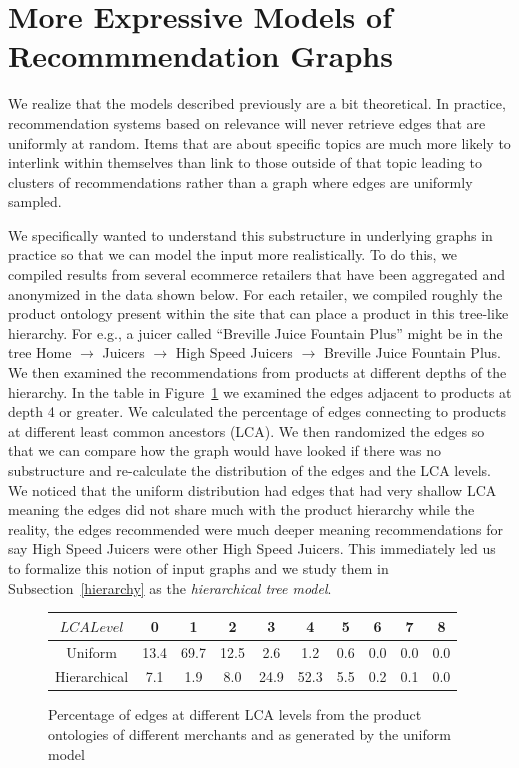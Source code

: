 \section{More Expressive Models of Recommmendation Graphs}

We realize that the models described previously are a bit
theoretical. In practice, recommendation systems based on relevance
will never retrieve edges that are uniformly at random. Items that are
about specific topics are much more likely to interlink within
themselves than link to those outside of that topic leading to
clusters of recommendations rather than a graph where edges are
uniformly sampled.

We specifically wanted to understand this substructure in underlying
graphs in practice so that we can model the input more realistically.
To do this, we compiled results from several ecommerce retailers that
have been aggregated and anonymized in the data shown below. For each
retailer, we compiled roughly the product ontology present within the
site that can place a product in this tree-like hierarchy. For e.g., a
juicer called ``Breville Juice Fountain Plus'' might be in the tree
Home $\rightarrow$ Juicers $\rightarrow$ High Speed Juicers
$\rightarrow$ Breville Juice Fountain Plus. We then examined the
recommendations from products at different depths of the hierarchy. In
the table in Figure~\ref{fig:hier} we examined the edges adjacent to
products at depth 4 or greater. We calculated the percentage of edges
connecting to products at different least common ancestors (LCA).  We
then randomized the edges so that we can compare how the graph would
have looked if there was no substructure and re-calculate the
distribution of the edges and the LCA levels. We noticed that the
uniform distribution had edges that had very shallow LCA meaning the
edges did not share much with the product hierarchy while the reality,
the edges recommended were much deeper meaning recommendations for say
High Speed Juicers were other High Speed Juicers. This immediately led us
to formalize this notion of input graphs and we study them in Subsection~\ref{hierarchy}
as the {\em hierarchical tree model}.

\begin{figure}[h]
  \centering
  \begin{tabular}{ |c|c|c|c|c|c|c|c|c|c| }
    \hline
    $LCA Level$ & 0 & 1 & 2 & 3 & 4 & 5 & 6 & 7 & 8 \\ \hline
    Uniform & 13.4 & 69.7 & 12.5 & 2.6 & 1.2 & 0.6 & 0.0 & 0.0 & 0.0 \\ \hline
    Hierarchical & 7.1 & 1.9 & 8.0 & 24.9 & 52.3 & 5.5 & 0.2 & 0.1 & 0.0 \\    
    \hline
  \end{tabular}
  \caption{Percentage of edges at different LCA levels from the product ontologies of different merchants and as generated by the uniform model}\label{fig:hier}
\end{figure} 


